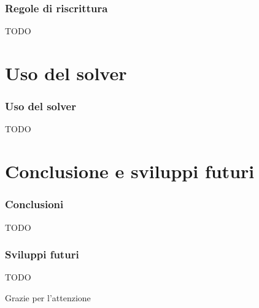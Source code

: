 \documentclass{beamer}
\begin{document}
\begin{frame}
	\frametitle{Regole di riscrittura}
	TODO
\end{frame}

\section{Uso del solver}

\begin{frame}
	\frametitle{Uso del solver}
	TODO
\end{frame}

\section{Conclusione e sviluppi futuri}

\begin{frame}
  \frametitle{Conclusioni}
  TODO
\end{frame}


\begin{frame}
  \frametitle{Sviluppi futuri}
  TODO
\end{frame}


\begin{frame}
  \Huge{\centerline{Grazie per l'attenzione}}
\end{frame}

\end{document}
